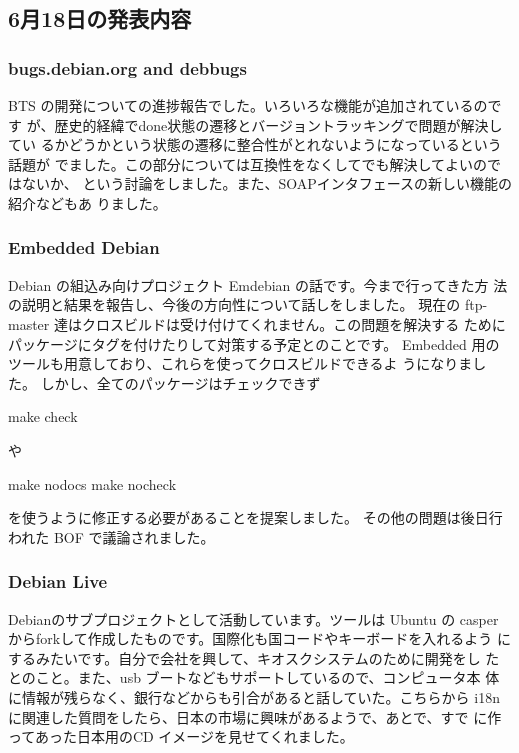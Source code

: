 \documentclass[mingoth,a4paper]{jsarticle}
\begin{document}
\subsection{6月18日の発表内容}

\subsubsection{bugs.debian.org and debbugs}

BTS の開発についての進捗報告でした。いろいろな機能が追加されているのです
が、歴史的経緯でdone状態の遷移とバージョントラッキングで問題が解決してい
るかどうかという状態の遷移に整合性がとれないようになっているという話題が
でました。この部分については互換性をなくしてでも解決してよいのではないか、
という討論をしました。また、SOAPインタフェースの新しい機能の紹介などもあ
りました。

\subsubsection{Embedded Debian}

  Debian の組込み向けプロジェクト Emdebian の話です。今まで行ってきた方
  法の説明と結果を報告し、今後の方向性について話しをしました。 現在の 
  ftp-master 達はクロスビルドは受け付けてくれません。この問題を解決する
  ためにパッケージにタグを付けたりして対策する予定とのことです。
  Embedded 用のツールも用意しており、これらを使ってクロスビルドできるよ
  うになりました。 しかし、全てのパッケージはチェックできず
  \begin{commandline}
  make check
  \end{commandline}
  や
  \begin{commandline}
  make nodocs
  make nocheck
  \end{commandline}
  を使うように修正する必要があることを提案しました。
  その他の問題は後日行われた BOF で議論されました。

\subsubsection{Debian Live}
 Debianのサブプロジェクトとして活動しています。ツールは Ubuntu の casper 
 からforkして作成したものです。国際化も国コードやキーボードを入れるよう
 にするみたいです。自分で会社を興して、キオスクシステムのために開発をし
 たとのこと。また、usb ブートなどもサポートしているので、コンピュータ本
 体に情報が残らなく、銀行などからも引合があると話していた。こちらから
 i18nに関連した質問をしたら、日本の市場に興味があるようで、あとで、すで
 に作ってあった日本用のCD イメージを見せてくれました。
\end{document}

